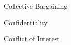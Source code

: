 \documentclass[11pt]{beamer}
\begin{document}
    \begin{frame}[t]{Collective Bargaining}
    \end{frame}

    \begin{frame}[t]{Confidentiality}
    \end{frame}

    \begin{frame}[t]{Conflict of Interest}
    \end{frame}
\end{document}
